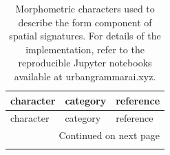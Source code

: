 \documentclass[fleqn,10pt]{wlscirep}
\begin{document}
\begin{longtable}{lll}
    \caption{\label{tab:form}Morphometric characters used to
    describe the form component of spatial signatures. For details of the implementation,
    refer to the reproducible Jupyter notebooks available at urbangrammarai.xyz.}\\
    \toprule
                                                character &     category &               reference \\
    \midrule
    \endfirsthead

    \toprule
                                                character &     category &               reference \\
    \midrule
    \endhead
    \midrule
    \multicolumn{3}{r}{{Continued on next page}} \\
    \midrule
    \endfoot


\end{longtable}
\end{document}
